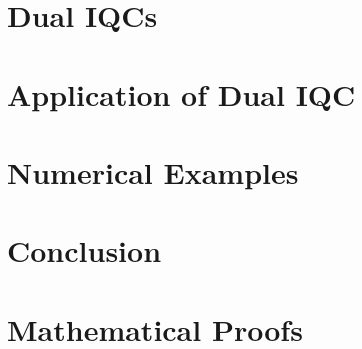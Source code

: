 \documentclass[journal,10pt,doublecolumn,twoside, a4paper]{IEEEtran}
\begin{document}
\section{Dual IQCs}

\section{Application of Dual IQC}


\section{Numerical Examples}

\section{Conclusion}\label{sec:conc}


\appendices
\renewcommand{\thesubsection}{\thesection.\arabic{subsection}}
\section{Mathematical Proofs}





\vspace{12pt}
\end{document}
